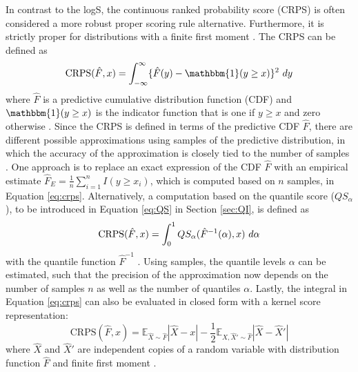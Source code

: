\documentclass[a4paper,oneside,bibliography=totoc]{scrbook}
\begin{document}
\noindent
In contrast to the logS, the continuous ranked probability score (CRPS) is often considered a more robust proper scoring rule alternative. Furthermore, it is strictly proper for distributions with a finite first moment \cite{gneiting_probabilistic_2007}. 
The CRPS 
can be defined as
\begin{equation}
    \text{CRPS}(\hat{F},x)= \int^{\infty}_{-\infty}\{\hat{F}(y)-\mathbbm{1}(y\geq x)\}^2 \thinspace \thinspace  dy
    \label{eq:crps}
\end{equation}
where $\hat{F}$ is a predictive cumulative distribution function (CDF) and $\mathbbm{1}(y\geq x)$ is the indicator function that is one if $y\geq x$ and zero otherwise \cite{bracher_evaluating_2021, matheson_scoring_1976}. 
Since the CRPS is defined in terms of the predictive CDF $\hat{F}$, there are different possible approximations using samples of the predictive distribution, in which the accuracy of the approximation is closely tied to the number of samples \cite{gneiting_strictly_2007, koochali_random_2022}.
One approach is to replace an exact expression of the CDF $\hat{F}$ with an empirical estimate $\hat{F}_E= \frac{1}{n}\sum_{i=1}^nI(y\geq x_i)$, which is computed based on $n$ samples, in Equation \ref{eq:crps}.
Alternatively, a computation based on the quantile score ($QS_\alpha$), to be introduced in Equation \ref{eq:QS} in Section \ref{sec:QI}, is defined as
\begin{equation}
    \text{CRPS}(\hat{F},x)= \int^{1}_{0}QS_\alpha(\hat{F}^{-1}(\alpha), x) \thinspace \thinspace d\alpha
    \label{eq:crps_ql}
\end{equation}
with the quantile function $\hat{F}^{-1}$ \cite{salinas_high-dimensional_2019}. Using samples, the quantile levels $\alpha$ can be estimated, such that the precision of the approximation now depends on the number of samples $n$ as well as the number of quantiles $\alpha$.
Lastly, the integral in Equation \ref{eq:crps} can also be evaluated in closed form with a kernel score representation:
\begin{equation}
    \text{CRPS}(\hat{F}, x) = \mathbb{E}_{\hat{X}\sim \hat{F}}|\hat{X}-x|-\frac{1}{2} \mathbb{E}_{\hat{X}, \hat{X}' \sim \hat{F}}|\hat{X}-\hat{X}'|
    \label{eq:crps_cf}
\end{equation}
where $\hat{X}$ and $\hat{X}'$ are independent copies of a random variable with distribution function $\hat{F}$ and finite first moment \cite{gneiting_strictly_2007}. 
\end{document}
